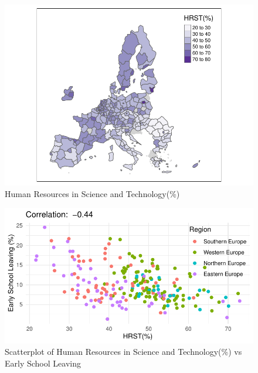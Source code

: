 \documentclass[
  letterpaper,
  DIV=11,
  numbers=noendperiod,
  abstract]{scrartcl}
\begin{document}
\begin{figure}[H]

{\centering \includegraphics[width=1\textwidth,height=\textheight]{report_files/figure-pdf/mappa HRST-1.pdf}

}

\caption{Human Resources in Science and Technology(\%)}

\end{figure}%

\begin{figure}[H]

{\centering \includegraphics[width=1\textwidth,height=\textheight]{report_files/figure-pdf/scatter HRST-1.pdf}

}

\caption{Scatterplot of Human Resources in Science and Technology(\%) vs
Early School Leaving}

\end{figure}%
\end{document}
